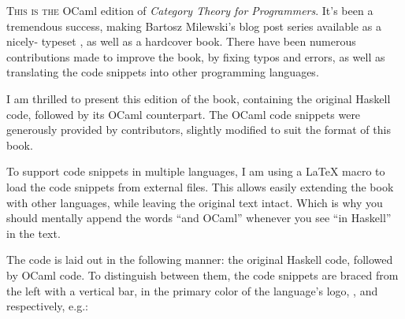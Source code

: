 
\lettrine[lhang=0.17]{T}{his is the} OCaml edition of \emph{Category Theory for Programmers}.
It's been a tremendous success, making Bartosz Milewski's blog post series available as a nicely-
typeset , as well as a hardcover book. There have been numerous contributions made
to improve the book, by fixing typos and errors, as well as translating the code snippets into
other programming languages.

I am thrilled to present this edition of the book, containing the original Haskell code, followed by
its OCaml counterpart. The OCaml code snippets were generously provided by
 contributors, slightly 
modified to suit the format of this book.

To support code snippets in multiple languages, I am using a \LaTeX{} macro to load the code snippets
from external files. This allows easily extending the book with other languages, while leaving the 
original text intact. Which is why you should mentally append the words ``and OCaml'' whenever you see
``in Haskell'' in the text.

The code is laid out in the following manner: the original Haskell code, followed by OCaml code.
To distinguish between them, the code snippets are braced from the left with a vertical bar, in the primary
color of the language's logo, , 
and  respectively, e.g.:

\unskip
{}
\NoIndentAfterThis